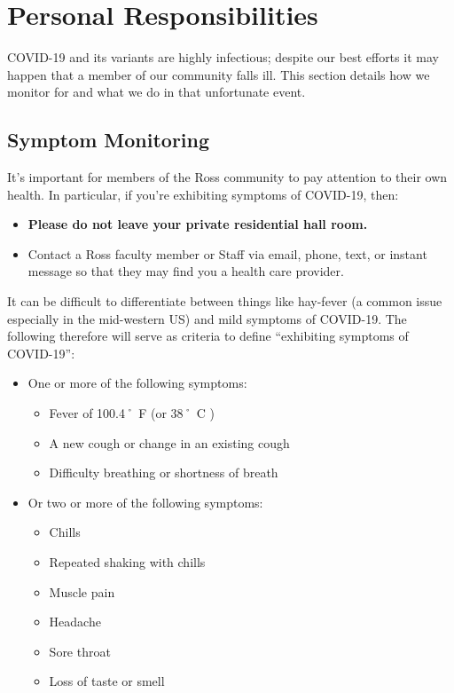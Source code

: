 \documentclass{ross}
\begin{document}
\section*{Personal Responsibilities}

COVID-19 and its variants are highly infectious; despite our best efforts it may happen that a member of our community falls ill. This section details how we monitor for and what we do in that unfortunate event. 


\subsection*{Symptom Monitoring}

It's important for members of the Ross community to pay attention to their own health. In particular, if you're exhibiting symptoms of COVID-19, then:
\begin{itemize}
    \item {\bf Please do not leave your private residential hall room.} 
    \item Contact a Ross faculty member or Staff via email, phone, text, or instant message so that they may find you a health care provider. 
\end{itemize}

It can be difficult to differentiate between things like hay-fever (a common issue especially in the mid-western US) and mild symptoms of COVID-19. The following therefore will serve as criteria to define ``exhibiting symptoms of COVID-19'':

\begin{itemize}
    \item One or more of the following symptoms:
    \begin{itemize}
        \item Fever of 100.4˚ F (or 38˚ C )
        \item A new cough or change in an existing cough
        \item Difficulty breathing or shortness of breath
    \end{itemize}
    \item Or two or more of the following symptoms:
    \begin{itemize}
        \item Chills
        \item Repeated shaking with chills
        \item Muscle pain
        \item Headache
        \item Sore throat
        \item Loss of taste or smell
    \end{itemize}
\end{itemize}
\end{document}
